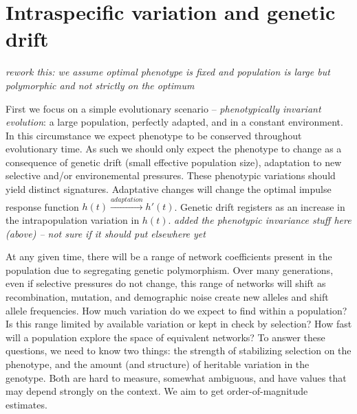 \documentclass[9 pt]{article}
\newcommand{\plr}[1]{{\color{blue}\it #1}}
\newcommand{\jss}[1]{{\color{olive}\it #1}}
\newcommand{\1}{\mathbbm{1}}
\begin{document}
  \section*{Intraspecific variation and genetic drift}

  \plr{rework this: we assume optimal phenotype is fixed and population is large but polymorphic and not strictly on the optimum}

First we focus on a simple evolutionary scenario -- \emph{phenotypically invariant evolution}: a large population, perfectly adapted, and in a constant environment. In this circumstance we expect phenotype to be conserved throughout evolutionary time. As such we should only expect the phenotype to change as a consequence of genetic drift (small effective population size), adaptation to new selective and/or environemental pressures. These phenotypic variations should yield distinct signatures. Adaptative changes will change the optimal impulse response function $h(t) \xrightarrow{adaptation} h'(t)$. Genetic drift registers as an increase in the intrapopulation variation in $h(t)$. 
 \jss{added the phenotypic invariance stuff here (above) -- not sure if it should put elsewhere yet}

  At any given time, there will be a range of network coefficients present in the population
  due to segregating genetic polymorphism.
  Over many generations, even if selective pressures do not change,
  this range of networks will shift 
  as recombination, mutation, and demographic noise create new alleles and shift allele frequencies.
  How much variation do we expect to find within a population?
  Is this range limited by available variation or kept in check by selection?
  How fast will a population explore the space of equivalent networks?
  To answer these questions, we need to know two things:
  the strength of stabilizing selection on the phenotype,
  and the amount (and structure) of heritable variation in the genotype.
  Both are hard to measure, somewhat ambiguous, and have values that may depend strongly on the context.
  We aim to get order-of-magnitude estimates.
\end{document}

